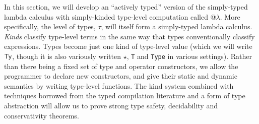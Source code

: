 In this section, we will develop an ``actively typed'' version of the simply-typed lambda calculus with simply-kinded type-level computation called @$\lambda$. More specifically, the level of types, $\tau$, will itself form a simply-typed lambda calculus. \emph{Kinds} classify type-level terms in the same way that types conventionally classify expressions. Types become just one kind  of type-level value (which we will write $\textsf{Ty}$, though it is also variously written $\star$, \verb|T| and \verb|Type| in various settings). Rather than there being a fixed set of type and operator constructors, we allow the programmer to declare new  constructors, and give their static and dynamic semantics by writing type-level functions. The kind system combined with techniques borrowed from the typed compilation literature and a form of type abstraction will allow us to prove strong type safety, decidability and conservativity theorems.

